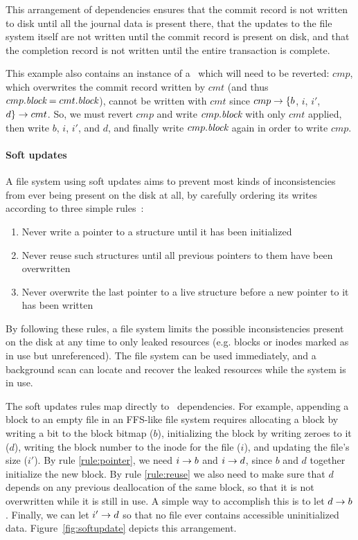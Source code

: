 This arrangement of dependencies ensures that the commit record is not written
to disk until all the journal data is present there, that the updates to the
file system itself are not written until the commit record is present on disk,
and that the completion record is not written until the entire transaction is
complete.

This example also contains an instance of a \patch\ which will need to be
reverted: $cmp$, which overwrites the commit record written by $cmt$ (and
thus $cmp.\textit{block} = cmt.\textit{block}$), cannot be written with $cmt$ since
$cmp \rightarrow \{b$, $i$, $i'$, $d\} \rightarrow cmt$.
%
So, we must revert $cmp$ and write $cmp.\textit{block}$ with only $cmt$ applied,
then write $b$, $i$, $i'$, and $d$, and finally write $cmp.\textit{block}$
again in order to write $cmp$.

\paragraph{Soft updates}
%
A file system using soft updates aims to prevent most kinds of inconsistencies
from ever being present on the disk at all, by carefully ordering its writes
according to three simple rules~\cite{ganger00soft}:

\begin{enumerate}
\item \label{rule:pointer} Never write a pointer to a structure until it has been initialized
\item \label{rule:reuse} Never reuse such structures until all previous pointers to them have been overwritten
\item \label{rule:overwrite} Never overwrite the last pointer to a live structure before a new pointer to it has been written
\end{enumerate}

\noindent
By following these rules, a file system limits the possible inconsistencies
present on the disk at any time to only leaked resources (e.g. blocks or inodes
marked as in use but unreferenced). The file system can be used immediately,
and a background scan can locate and recover the leaked resources while the
system is in use.

The soft updates rules map directly to \patch\ dependencies.
%
For example, appending a block to an empty file in an FFS-like file system
requires allocating a block by writing a bit to the block bitmap ($b$),
initializing the block by writing zeroes to it ($d$), writing the block number
to the inode for the file ($i$), and updating the file's size ($i'$).
%
By rule \ref{rule:pointer}, we need $i \rightarrow b$ and $i \rightarrow d$,
since $b$ and $d$ together initialize the new block.
%
By rule \ref{rule:reuse} we also need to make sure that $d$ depends on any
previous deallocation of the same block, so that it is not overwritten while
it is still in use.
%
A simple way to accomplish this is to let $d \rightarrow b$.
%
Finally, we can let $i' \rightarrow d$ so that no file ever contains
accessible uninitialized data.
%
Figure~\ref{fig:softupdate} depicts this arrangement.


